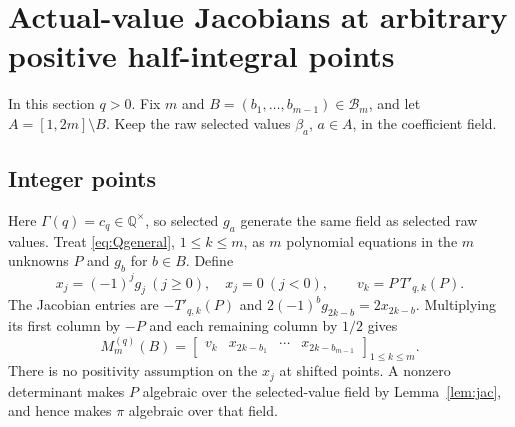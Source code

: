 \documentclass[11pt,a4paper]{article}
\theoremstyle{definition}\newtheorem{definition}[theorem]{Definition}
\theoremstyle{remark}\newtheorem{remark}[theorem]{Remark}
\newcommand{\Q}{\mathbb Q}\newcommand{\Qb}{\overline{\mathbb Q}}
\begin{document}
\section{Actual-value Jacobians at arbitrary positive half-integral points}\label{sec:matrices}
In this section $q>0$. Fix $m$ and $B=(b_1,\ldots,b_{m-1})\in\mathcal B_m$, and let $A=[1,2m]\setminus B$. Keep the raw selected values $\beta_a$, $a\in A$, in the coefficient field.

\subsection{Integer points}
Here $\Gamma(q)=c_q\in\Q^\times$, so selected $g_a$ generate the same field as selected raw values. Treat \eqref{eq:Qgeneral}, $1\le k\le m$, as $m$ polynomial equations in the $m$ unknowns $P$ and $g_b$ for $b\in B$. Define
\[
x_j=(-1)^jg_j\ (j\ge0),\quad x_j=0\ (j<0),\qquad
v_k=P\,T'_{q,k}(P).
\]
The Jacobian entries are $-T'_{q,k}(P)$ and $2(-1)^bg_{2k-b}=2x_{2k-b}$. Multiplying its first column by $-P$ and each remaining column by $1/2$ gives
\begin{equation}\label{eq:M1}
M_m^{(q)}(B)=\left[\begin{array}{c|ccc}
v_k&x_{2k-b_1}&\cdots&x_{2k-b_{m-1}}
\end{array}\right]_{1\le k\le m}.
\end{equation}
There is no positivity assumption on the $x_j$ at shifted points. A nonzero determinant makes $P$ algebraic over the selected-value field by Lemma~\ref{lem:jac}, and hence makes $\pi$ algebraic over that field.
\end{document}
